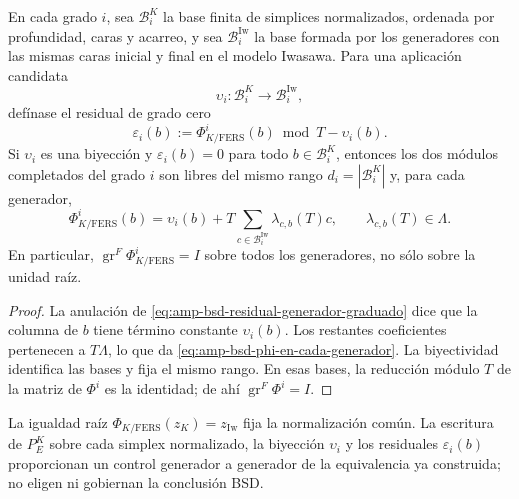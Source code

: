 \begin{lemma}
\label{lem:amp-bsd-bases-emparejadas-kato-fers}
En cada grado \(i\), sea \(\mathcal B_i^K\) la base finita de simplices
normalizados, ordenada por profundidad, caras y acarreo, y sea
\(\mathcal B_i^{\mathrm{Iw}}\) la base formada por los generadores con las
mismas caras inicial y final en el modelo Iwasawa. Para una aplicación
candidata
\[
 \upsilon_i:\mathcal B_i^K\longrightarrow
 \mathcal B_i^{\mathrm{Iw}},
\]
defínase el residual de grado cero
\begin{equation}\label{eq:amp-bsd-residual-generador-graduado}
 \varepsilon_i(b)
 :=\Phi_{K/\mathrm{FERS}}^i(b)\bmod T-\upsilon_i(b).
\end{equation}
Si \(\upsilon_i\) es una biyección y
\(\varepsilon_i(b)=0\) para todo \(b\in\mathcal B_i^K\), entonces los dos
módulos completados del grado \(i\) son libres del mismo rango
\(d_i=|\mathcal B_i^K|\) y, para cada generador,
\begin{equation}\label{eq:amp-bsd-phi-en-cada-generador}
 \Phi_{K/\mathrm{FERS}}^i(b)
 =\upsilon_i(b)
  +T\sum_{c\in\mathcal B_i^{\mathrm{Iw}}}
    \lambda_{c,b}(T)c,
 \qquad \lambda_{c,b}(T)\in\Lambda.
\end{equation}
En particular,
\(\operatorname{gr}^{F}\Phi_{K/\mathrm{FERS}}^i=I\) sobre todos los
generadores, no sólo sobre la unidad raíz.
\end{lemma}

\begin{proof}
La anulación de \eqref{eq:amp-bsd-residual-generador-graduado} dice que la
columna de \(b\) tiene término constante \(\upsilon_i(b)\). Los restantes
coeficientes pertenecen a \(T\Lambda\), lo que da
\eqref{eq:amp-bsd-phi-en-cada-generador}. La biyectividad identifica las
bases y fija el mismo rango. En esas bases, la reducción módulo \(T\) de la
matriz de \(\Phi^i\) es la identidad; de ahí
\(\operatorname{gr}^{F}\Phi^i=I\).
\end{proof}

La igualdad raíz
\(\Phi_{K/\mathrm{FERS}}(z_K)=z_{\mathrm{Iw}}\) fija la normalización común.
La escritura de \(P_E^K\) sobre cada simplex normalizado, la biyección
\(\upsilon_i\) y los residuales \(\varepsilon_i(b)\) proporcionan un
control generador a generador de la equivalencia ya construida; no eligen ni
gobiernan la conclusión BSD.

